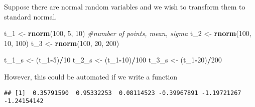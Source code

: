 \documentclass[11pt,]{article}
\newenvironment{Shaded}{\begin{snugshade}}{\end{snugshade}}
\newcommand{\KeywordTok}[1]{\textcolor[rgb]{0.13,0.29,0.53}{\textbf{#1}}}
\newcommand{\DecValTok}[1]{\textcolor[rgb]{0.00,0.00,0.81}{#1}}
\newcommand{\StringTok}[1]{\textcolor[rgb]{0.31,0.60,0.02}{#1}}
\newcommand{\CommentTok}[1]{\textcolor[rgb]{0.56,0.35,0.01}{\textit{#1}}}
\newcommand{\ControlFlowTok}[1]{\textcolor[rgb]{0.13,0.29,0.53}{\textbf{#1}}}
\newcommand{\OperatorTok}[1]{\textcolor[rgb]{0.81,0.36,0.00}{\textbf{#1}}}
\newcommand{\NormalTok}[1]{#1}
\begin{document}
Suppose there are normal random variables and we wish to transform them
to standard normal.

\begin{Shaded}
\begin{Highlighting}[]
\NormalTok{t_}\DecValTok{1}\NormalTok{ <-}\StringTok{ }\KeywordTok{rnorm}\NormalTok{(}\DecValTok{100}\NormalTok{, }\DecValTok{5}\NormalTok{, }\DecValTok{10}\NormalTok{) }\CommentTok{#number of points, mean, sigma}
\NormalTok{t_}\DecValTok{2}\NormalTok{ <-}\StringTok{ }\KeywordTok{rnorm}\NormalTok{(}\DecValTok{100}\NormalTok{, }\DecValTok{10}\NormalTok{, }\DecValTok{100}\NormalTok{)}
\NormalTok{t_}\DecValTok{3}\NormalTok{ <-}\StringTok{ }\KeywordTok{rnorm}\NormalTok{(}\DecValTok{100}\NormalTok{, }\DecValTok{20}\NormalTok{, }\DecValTok{200}\NormalTok{)}

\NormalTok{t_1_s <-}\StringTok{ }\NormalTok{(t_}\DecValTok{1}\OperatorTok{-}\DecValTok{5}\NormalTok{)}\OperatorTok{/}\DecValTok{10} 
\NormalTok{t_2_s <-}\StringTok{ }\NormalTok{(t_}\DecValTok{1}\OperatorTok{-}\DecValTok{10}\NormalTok{)}\OperatorTok{/}\DecValTok{100}
\NormalTok{t_3_s <-}\StringTok{ }\NormalTok{(t_}\DecValTok{1}\OperatorTok{-}\DecValTok{20}\NormalTok{)}\OperatorTok{/}\DecValTok{200}
\end{Highlighting}
\end{Shaded}

However, this could be automated if we write a function

\begin{Shaded}
\end{Shaded}

\begin{verbatim}
## [1]  0.35791590  0.95332253  0.08114523 -0.39967891 -1.19721267 -1.24154142
\end{verbatim}
\end{document}
